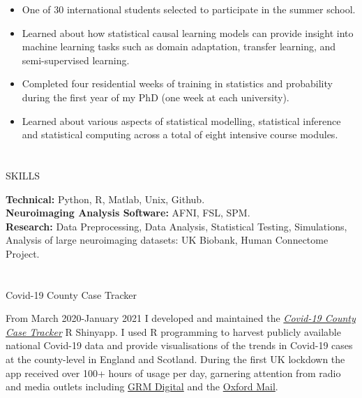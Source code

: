 \documentclass{my_cv}
\begin{document}
%
    {\begin{itemize}[topsep=0pt,itemsep=0pt,partopsep=0pt, parsep=0pt] 
    \item One of 30 international students selected to participate in the summer school. 
    \item Learned about how statistical causal learning models can provide insight into machine learning tasks such as domain adaptation, transfer learning, and semi-supervised learning. 
    \end{itemize}
    }%
     
%
    {\uline{ \hfill {}}}%
    {\begin{itemize}[topsep=0pt,itemsep=0pt,partopsep=0pt, parsep=0pt] 
    \item Completed four residential weeks of training in statistics and probability during the first year of my PhD (one week at each university).
    \item Learned about various aspects of statistical modelling, statistical inference and statistical computing across a total of eight intensive course modules.
    \end{itemize}
    }%

\section{\faGears}{SKILLS}

\textbf{Technical:} Python, R, Matlab, Unix, Github. \\
\textbf{Neuroimaging Analysis Software:} AFNI, FSL, SPM.  \\
\textbf{Research:} Data Preprocessing, Data Analysis, Statistical Testing, Simulations, Analysis of large neuroimaging datasets: UK Biobank, Human Connectome Project. \\

\section{\faLaptop}{Covid-19 County Case Tracker}

From March 2020-January 2021 I developed and maintained the \href{https://covid19cct.shinyapps.io/covid19cct/}{\textit{Covid-19 County Case Tracker}} R Shinyapp. I used R programming to harvest publicly available national Covid-19 data and provide visualisations of the trends in Covid-19 cases at the county-level in England and Scotland. During the first UK lockdown the app received over 100+ hours of usage per day, garnering attention from radio and media outlets including \href{https://grm.digital/heroes-of-covid19/info/}{GRM Digital} and the \href{https://www.oxfordmail.co.uk/news/18358052.app-tracks-oxfordshire-covid-19-cases/}{Oxford Mail}.
\end{document}
